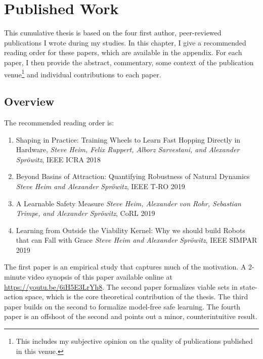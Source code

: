 
\chapter{Published Work} \label{chap:pubs}

This cumulative thesis is based on the four first author, peer-reviewed publications I wrote during my studies. In this chapter, I give a recommended reading order for these papers, which are available in the appendix. For each paper, I then provide the abstract, commentary, some context of the publication venue\footnote{This includes my subjective opinion on the quality of publications published in this venue.} and individual contributions to each paper.

\section{Overview}
The recommended reading order is:
\begin{enumerate}
    \item Shaping in Practice: Training Wheels to Learn Fast Hopping Directly in Hardware, \emph{Steve Heim, Felix Ruppert, Alborz Sarvestani, and Alexander Spr\"{o}witz}, IEEE ICRA 2018
    \item Beyond Basins of Attraction: Quantifying Robustness of Natural Dynamics \emph{Steve Heim and Alexander Spr\"{o}witz}, IEEE T-RO 2019
    \item A Learnable Safety Measure \emph{Steve Heim, Alexander von Rohr, Sebastian Trimpe, and Alexander Spr\"{o}witz}, CoRL 2019
    \item Learning from Outside the Viability Kernel: Why we should build Robots that can Fall with Grace \emph{Steve Heim and Alexander Spr\"{o}witz}, IEEE SIMPAR 2019
\end{enumerate}
The first paper is an empirical study that captures much of the motivation. A 2-minute video synopsis of this paper available online at \url{https://youtu.be/6iH5E3LrYh8}. The second paper formalizes viable sets in state-action space, which is the core theoretical contribution of the thesis. The third paper builds on the second to formalize model-free safe learning. The fourth paper is an offshoot of the second and points out a minor, counterintuitive result.

